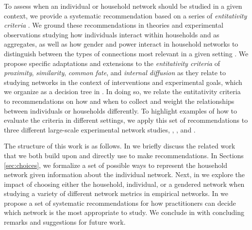 To assess when an individual or household network should be studied in a given context, we provide a systematic recommendation based on a series of \textit{entitativity criteria} \citep{campbell1958common}. We ground these recommendations in theories and experimental observations studying how individuals interact within households and as aggregates, as well as how gender and power interact in household networks to distinguish between the types of connections most relevant in a given setting \citep{werner1998}. We propose specific adaptations and extensions to the \textit{entitativity criteria} of \textit{proximity}, \textit{similarity}, \textit{common fate}, and \textit{internal diffusion} as they relate to studying networks in the context of interventions and experimental goals, which we organize as a decision tree in . In doing so, we relate the entitativity criteria to recommendations on how and when to collect and weight the relationships between individuals or households differently. To highlight examples of how to evaluate the criteria in different settings, we apply this set of recommendations to three different large-scale experimental network studies, \cite{banerjee2013}, \cite{alexander2022algorithms}, and \cite{airoldi2024}.

The structure of this work is as follows. 
In  we briefly discuss the related work that we both build upon and directly use to make recommendations. In Sections \ref{sec:choices}, we formalize a set of possible ways to represent the household network given information about the individual network. Next, in  we explore the impact of choosing either the household, individual, or a gendered network when studying a variety of different network metrics in empirical networks. In  we propose a set of systematic recommendations for how practitioners can decide which network is the most appropriate to study. We conclude in  with concluding remarks and suggestions for future work.



